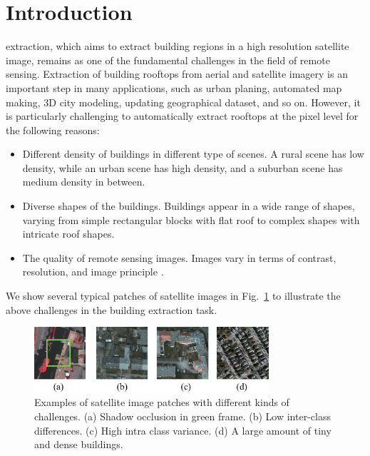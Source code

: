 %
\section{Introduction}
\label{sec:intro}


 extraction, which aims to extract building regions in a high resolution satellite image, remains as one of the fundamental challenges in the field of remote sensing.
Extraction of building rooftops from aerial and satellite imagery is an important step in many applications, such as urban planing, automated map making, 3D city modeling, updating geographical dataset, and so on.
However, it is particularly challenging to automatically extract rooftops at the pixel level for the following reasons:
%
\begin{itemize}
 \item Different density of buildings in different type of scenes. A rural scene has low density, while an urban scene has high density, and a suburban scene has medium density in between.
 \item Diverse shapes of the buildings. Buildings appear in a wide range of shapes, varying from simple rectangular blocks with flat roof to complex shapes with intricate roof shapes.
 \item The quality of remote sensing images. Images vary in terms of contrast, resolution, and image principle \cite{IEEEexample:huertas1988detecting}. 
\end{itemize}
%

We show several typical patches of satellite images in Fig.~\ref{fig:intro} to illustrate the above challenges in the building extraction task.

\begin{figure}
\centering
\includegraphics[width=8.7cm]{Figures/challenge.eps}
\caption{Examples of satellite image patches with different kinds of challenges. (a) Shadow occlusion in green frame. (b) Low inter-class differences. (c) High intra class variance. (d) A large amount of tiny and dense buildings.}
\label{fig:intro}
\end{figure}


